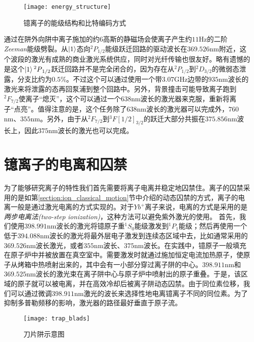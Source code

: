 \begin{figure}
    \centering
    \caption[镱离子的能级结构和比特编码方式]{镱离子的能级结构和比特编码方式\label{fig:energy_structure}}
    \texttt{[image: energy\_structure]}
\end{figure}

通过在阱外向阱中离子施加的约$6$高斯的静磁场会使离子产生约$11$Hz的二阶\emph{Zeeman}能级劈裂。从$\ket{1}$态向$^2P_{1/2}$能级跃迁回路的驱动波长在$369.526$nm附近，这个波段的激光有成熟的商业激光系统供应，同时对光纤传输也很友好。略有遗憾的是这个$\ket{1}{^2P}_{1/2}$跃迁回路并不是完全闭合的，因为存在从$^2P_{1/2}$到$^2D_{3/2}$的微弱态泄露，分支比约为$0.5$\%\cite[]{Olmschenk_Younge_Moehring_Matsukevich_Maunz_Monroe_2007}。不过这个可以通过使用一个带$3.07$GHz边带的$935$nm波长的激光来将泄露的态再回泵浦到整个回路中。另外，背景撞击可能导致离子跑到$^2F_{7/2}$使离子“熄灭”，这个可以通过一个$638$nm波长的激光器来克服，重新将离子“点亮”。值得注意的是，这个任务除了$638$nm波长的激光器可以完成外，$760$nm\cite[]{Huntemann_Okhapkin_Lipphardt_Weyers_Tamm_Peik_2012}、$355$nm\cite[]{Senko_2014}。另外，由于从$^2F_{7/2}$到$^3F[1/2]_{3/2}$的跃迁大部分共振在$375.856$nm波长上，因此$375$nm波长的激光也可以完成。

\section[镱离子的电离和囚禁]{镱离子的电离和囚禁}
为了能够研究离子的特性我们首先需要将离子电离并稳定地囚禁住。离子的囚禁采用的是如第\ref{section:ion_classical_motion}节中介绍的动态囚禁的方式，离子的电离一般是通过激光电离的方式实现的。对于$Yb^+$离子来说，电离的方式是采用的是\emph{两步电离法(two-step ionization)}\cite[]{Olmschenk_Younge_Moehring_Matsukevich_Maunz_Monroe_2007}，这种方法可以避免紫外激光的使用。
首先，我们使用$398.991$nm波长的激光将镱原子重$^1S_0$能级激发到$^1P_1$能级；然后再使用一个低于$394.088$nm波长的激光将最外层电子激发到连续态区域中去，比如通常采用的$369.526$nm波长激光，或者$355$nm波长、$375$nm波长。在实践中，镱原子一般填充在原子炉中并被放置在真空室中。需要激发时就通过施加恒定电流加热原子，使原子从烤箱中热喷射出来的，其中会有一小部分穿过离子阱的中心。$398.911$nm和$369.525$nm波长的激光束在离子阱中心与原子炉中喷射出的原子重叠。于是，该区域的原子就可以被电离，并在高效冷却后被离子阱动态囚禁。由于同位素位移，我们可以通过微调$398.911$nm激光的波长来选择性地电离镱离子不同的同位素。为了抑制多普勒频移的影响，激光器的路径最好垂直于原子流。

\begin{figure}
    \centering
    \caption[刀片阱示意图]{刀片阱示意图\label{fig:trap_blads}}
    \texttt{[image: trap\_blads]}
\end{figure}

